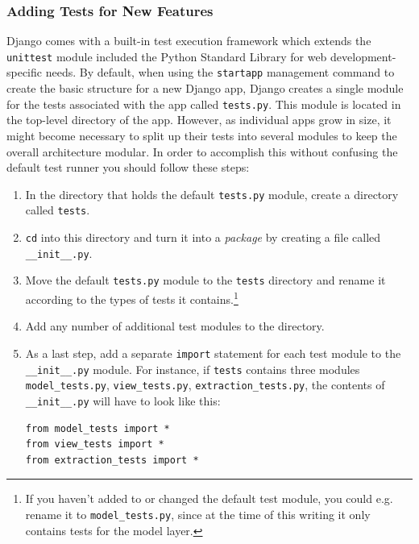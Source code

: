 \subsubsection{Adding Tests for New Features}
\label{sec:test}

Django comes with a built-in test execution framework which extends
the \texttt{unittest} module included the Python Standard Library for
web development-specific needs. By default, when using the
\texttt{startapp} management command to create the basic structure for
a new Django app, Django creates a single module for the tests
associated with the app called \texttt{tests.py}. This module is
located in the top-level directory of the app. However, as individual
apps grow in size, it might become necessary to split up their tests
into several modules to keep the overall architecture modular. In
order to accomplish this without confusing the default test runner you
should follow these steps:

\begin{enumerate}
\item In the directory that holds the default \texttt{tests.py}
  module, create a directory called \texttt{tests}.
\item \texttt{cd} into this directory and turn it into a
  \emph{package} by creating a file called \texttt{\_\_init\_\_.py}.
\item Move the default \texttt{tests.py} module to the \texttt{tests}
  directory and rename it according to the types of tests it
  contains.\footnote{If you haven't added to or changed the default
    test module, you could e.g. rename it to \texttt{model\_tests.py},
    since at the time of this writing it only contains tests for the
    model layer.}
\item Add any number of additional test modules to the directory.
\item As a last step, add a separate \texttt{import} statement for
  each test module to the \texttt{\_\_init\_\_.py} module. For
  instance, if \texttt{tests} contains three modules
  \texttt{model\_tests.py}, \texttt{view\_tests.py},
  \texttt{extraction\_tests.py}, the contents of
  \texttt{\_\_init\_\_.py} will have to look like this:
\begin{verbatim}
from model_tests import *
from view_tests import *
from extraction_tests import *
\end{verbatim}

\end{enumerate}

